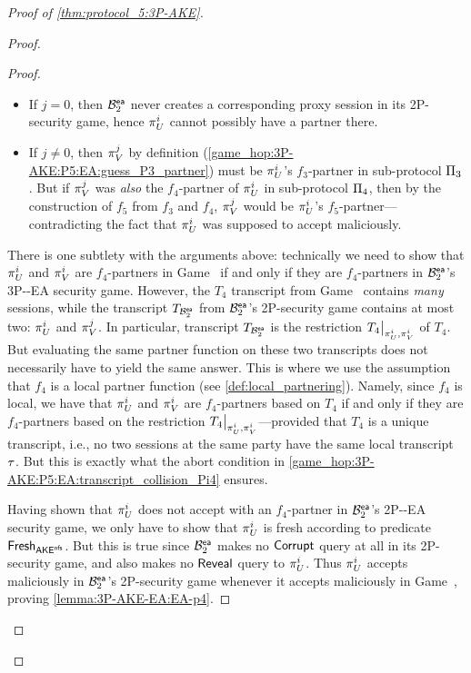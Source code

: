 \begin{proof}[Proof of \cref{thm:protocol_5:3P-AKE}]
\begin{proof}
\begin{proof}
\begin{itemize}
	\item If $j = 0$,
	then $\A[B]_2^{\ea}$ never creates a corresponding proxy session in its 2P-\akenfstext security game,
	hence $\oracle[U][i]$ cannot possibly have a partner there.

	\item If $j \neq 0$,
	then $\oracle[V][j]$ by definition
	(\cref{game_hop:3P-AKE:P5:EA:guess_P3_partner})
	must be $\oracle[U][i]$'s $f_3$-partner in sub-protocol $\protocol_3$.
	But if $\oracle[V][j]$ was \emph{also} the $f_4$-partner of $\oracle[U][i]$ in sub-protocol $\protocol_4$,
	then by the construction of $f_5$ from $f_3$ and $f_4$, $\oracle[V][j]$ would be $\oracle[U][i]$'s $f_5$-partner---contradicting the fact that $\oracle[U][i]$ was supposed to accept maliciously.



\end{itemize}

There is one subtlety with the arguments above:
technically we need to show that $\oracle[U][i]$ and $\oracle[V][i]$ are $f_4$-partners in Game~\game{} if and only if they are $f_4$-partners in $\A[B]_2^{\ea}$'s 3P-\akenfstext-EA security game.
However, the $T_4$ transcript from Game~\game{} contains \emph{many} sessions,
while the transcript $T_{\A[B]_2^{\ea}}$ from $\A[B]_2^{\ea}$'s  2P-\akenfstext security game contains at most two: $\oracle[U][i]$ and $\oracle[V][j]$.
In particular,
transcript $T_{\A[B]_2^{\ea}}$ is the restriction $\restrict{T_4}{\oracle[U][i], \oracle[V][i]}$ of $T_4$.
But evaluating the same partner function on these two transcripts does not necessarily have to yield the same answer.
This is where we use the assumption that $f_4$ is a local partner function
(see \cref{def:local_partnering}).
Namely,
since $f_4$ is local,
we have that
$\oracle[U][i]$ and $\oracle[V][i]$ are $f_4$-partners based on $T_4$ if and only if they are $f_4$-partners based on the restriction $\restrict{T_4}{\oracle[U][i], \oracle[V][i]}$---provided that $T_4$ is a unique transcript,
i.e., no two sessions at the same party have the same local transcript $\localtranscript$.
But this is exactly what the abort condition in \cref{game_hop:3P-AKE:P5:EA:transcript_collision_Pi4} ensures. 


Having shown that $\oracle[U][i]$ does not accept with an $f_4$-partner in $\A[B]_2^{\ea}$'s 2P-\akenfstext-EA security game,
we only have to show that $\oracle[U][i]$ is fresh according to predicate $\fresh_{\akenfs}$.
But this is true since $\A[B]_2^{\ea}$ makes no $\Corrupt$ query at all in its 2P-\akenfstext security game,
and also makes no $\Reveal$ query to $\oracle[U][i]$.
Thus $\oracle[U][i]$ accepts maliciously in $\A[B]_2^{\ea}$'s 2P-\akenfstext security game whenever it accepts maliciously in Game~\game{},
proving \cref{lemma:3P-AKE-EA:EA-p4}.
\end{proof}


\end{proof}
\end{proof}
